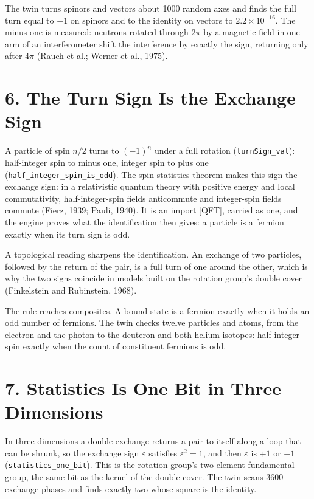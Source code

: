 \documentclass[10pt]{article}
\begin{document}
The twin turns spinors and vectors about 1000 random axes and finds the
full turn equal to \(-1\) on spinors and to the identity on vectors to
\(2.2\times10^{-16}\). The minus one is measured: neutrons rotated
through \(2\pi\) by a magnetic field in one arm of an interferometer
shift the interference by exactly the sign, returning only after
\(4\pi\) (Rauch et al.; Werner et al., 1975).

\hypertarget{the-turn-sign-is-the-exchange-sign}{%
\section{6. The Turn Sign Is the Exchange
Sign}\label{the-turn-sign-is-the-exchange-sign}}

A particle of spin \(n/2\) turns to \((-1)^n\) under a full rotation
(\texttt{turnSign\_val}): half-integer spin to minus one, integer spin
to plus one (\texttt{half\_integer\_spin\_is\_odd}). The spin-statistics
theorem makes this sign the exchange sign: in a relativistic quantum
theory with positive energy and local commutativity, half-integer-spin
fields anticommute and integer-spin fields commute (Fierz, 1939; Pauli,
1940). It is an import {[}QFT{]}, carried as one, and the engine proves
what the identification then gives: a particle is a fermion exactly when
its turn sign is odd.

A topological reading sharpens the identification. An exchange of two
particles, followed by the return of the pair, is a full turn of one
around the other, which is why the two signs coincide in models built on
the rotation group's double cover (Finkelstein and Rubinstein, 1968).

The rule reaches composites. A bound state is a fermion exactly when it
holds an odd number of fermions. The twin checks twelve particles and
atoms, from the electron and the photon to the deuteron and both helium
isotopes: half-integer spin exactly when the count of constituent
fermions is odd.

\hypertarget{statistics-is-one-bit-in-three-dimensions}{%
\section{7. Statistics Is One Bit in Three
Dimensions}\label{statistics-is-one-bit-in-three-dimensions}}

In three dimensions a double exchange returns a pair to itself along a
loop that can be shrunk, so the exchange sign \(\varepsilon\) satisfies
\(\varepsilon^2=1\), and then \(\varepsilon\) is \(+1\) or \(-1\)
(\texttt{statistics\_one\_bit}). This is the rotation group's
two-element fundamental group, the same bit as the kernel of the double
cover. The twin scans 3600 exchange phases and finds exactly two whose
square is the identity.
\end{document}
